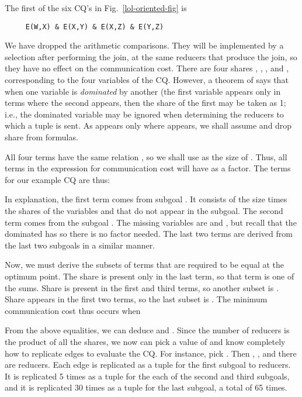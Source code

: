 \begin{example}
\label{lol-opt-ex}
The first of the six CQ's in Fig.~\ref{lol-oriented-fig} is

\begin{verbatim}
     E(W,X) & E(X,Y) & E(X,Z) & E(Y,Z)
\end{verbatim}
We have dropped the arithmetic comparisons.  They will be implemented by a selection after performing the join, at the same reducers that produce the join, so they have no effect on the communication cost.  There are four shares , , , and , corresponding to the four variables of the CQ.  However, a theorem of \cite{AU10} says that when one variable is {\em dominated} by another (the first variable appears only in terms where the second appears, then the share of the first may be taken as 1; i.e., the dominated variable may be ignored when determining the reducers to which a tuple is sent.  As  appears only where  appears, we shall assume  and drop share  from formulas.

All four terms have the same relation , so we shall use  as the size of .  Thus, all terms in the expression for communication cost will have  as a factor.  The terms for our example CQ are thus:

In explanation, the first term  comes from subgoal .  It consists of the size  times the shares of the variables  and  that do not appear in the subgoal.  The second term  comes from the subgoal .  The missing variables are  and , but recall that the dominated  has  so there is no factor  needed.  The last two terms are derived from the last two subgoals in a similar manner.

Now, we must derive the subsets of terms that are required to be equal at the optimum point.  The share  is present only in the last term, so that term is one of the sums.  Share  is present in the first and third terms, so another subset is .  Share  appears in the first two terms, so the last subset is .  The minimum communication cost thus occurs when


From the above equalities, we can deduce  and .  Since the number of reducers is the product of all the shares, we now can pick a value of  and know completely how to replicate edges to evaluate the CQ.  For instance, pick .  Then , , and there are  reducers.  Each edge is replicated as a tuple for the first subgoal  to  reducers.  It is replicated 5 times as a tuple for the each of the second and third subgoals, and it is replicated 30 times as a tuple for the last subgoal, a total of 65 times.
\end{example}


